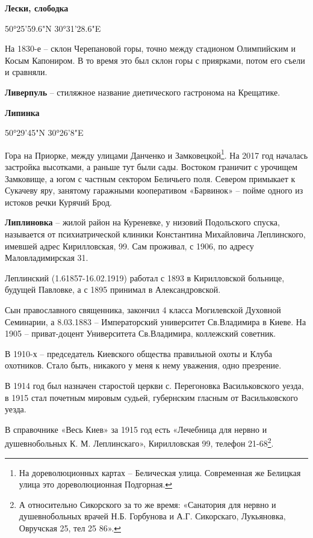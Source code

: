 \medskip

\textbf{Лески, слободка}

50°25'59.6"N 30°31'28.6"E

На 1830-е – склон Черепановой горы, точно между стадионом Олимпийским и Косым Капониром. В то время это был склон горы с приярками, потом его съели и сравняли.\\


\medskip


\textbf{Ливерпуль} – стиляжное название диетического гастронома на Крещатике.\\


\medskip


\textbf{Липинка}

50°29'45"N 30°26'8"E

Гора на Приорке, между улицами Данченко и Замковецкой\footnote{На дореволюционных картах – Белическая улица. Современная же Белицкая улица это дореволюционная Подгорная.}. На 2017 год началась застройка высотками, а раньше тут были сады. Востоком граничит с урочищем Замковище, а югом с частным сектором Беличьего поля. Севером примыкает к Сукачеву яру, занятому гаражными кооперативом «Барвинок» – пойме одного из истоков речки Курячий Брод.\\

\medskip


\textbf{Липлиновка} – жилой район на Куреневке, у низовий Подольского спуска, называется от психиатрической клиники Константина Михайловича Леплинского, имевшей адрес Кирилловская, 99. Сам проживал, с 1906, по адресу Маловладимирская 31.

Леплинский (1.61857-16.02.1919) работал с 1893 в Кирилловской больнице, будущей Павловке, а с 1895 принимал в Александровской.
 
Сын православного священника, закончил 4 класса Могилевской Духовной Семинарии, а 8.03.1883 – Императорский университет Св.Владимира в Киеве. На 1905 – приват-доцент Университета Св.Владимира, коллежский советник. 

В 1910-х – председатель Киевского общества правильной охоты и Клуба охотников. Стало быть, никакого у меня к нему уважения, одно презрение.

В 1914 год был назначен старостой церкви с. Перегоновка Васильковского уезда, в 1915 стал почетным мировым судьей, губернским гласным от Васильковского уезда.

В справочнике «Весь Киев» за 1915 год есть «Лечебница для нервно и душевнобольных К. М. Леплинскаго», Кирилловская 99, телефон 21-68\footnote{А относительно Сикорского за то же время: «Санатория для нервно и душевнобольных врачей Н.Б. Горбунова и А.Г. Сикорскаго, Лукьяновка, Овручская 25, тел 25 86».}. 
\\

